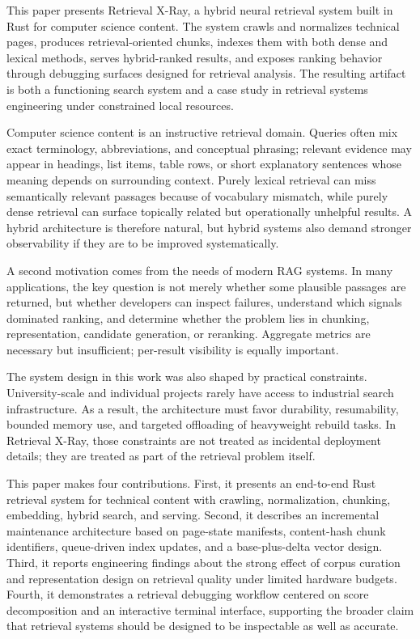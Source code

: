 \documentclass[conference]{IEEEtran}
\newcommand{\system}{Retrieval X-Ray\xspace}
\begin{document}
This paper presents \system, a hybrid neural retrieval system built in Rust for computer science content. The system crawls and normalizes technical pages, produces retrieval-oriented chunks, indexes them with both dense and lexical methods, serves hybrid-ranked results, and exposes ranking behavior through debugging surfaces designed for retrieval analysis. The resulting artifact is both a functioning search system and a case study in retrieval systems engineering under constrained local resources.

Computer science content is an instructive retrieval domain. Queries often mix exact terminology, abbreviations, and conceptual phrasing; relevant evidence may appear in headings, list items, table rows, or short explanatory sentences whose meaning depends on surrounding context. Purely lexical retrieval can miss semantically relevant passages because of vocabulary mismatch, while purely dense retrieval can surface topically related but operationally unhelpful results. A hybrid architecture is therefore natural, but hybrid systems also demand stronger observability if they are to be improved systematically.

A second motivation comes from the needs of modern RAG systems. In many applications, the key question is not merely whether some plausible passages are returned, but whether developers can inspect failures, understand which signals dominated ranking, and determine whether the problem lies in chunking, representation, candidate generation, or reranking. Aggregate metrics are necessary but insufficient; per-result visibility is equally important.

The system design in this work was also shaped by practical constraints. University-scale and individual projects rarely have access to industrial search infrastructure. As a result, the architecture must favor durability, resumability, bounded memory use, and targeted offloading of heavyweight rebuild tasks. In \system, those constraints are not treated as incidental deployment details; they are treated as part of the retrieval problem itself.

This paper makes four contributions. First, it presents an end-to-end Rust retrieval system for technical content with crawling, normalization, chunking, embedding, hybrid search, and serving. Second, it describes an incremental maintenance architecture based on page-state manifests, content-hash chunk identifiers, queue-driven index updates, and a base-plus-delta vector design. Third, it reports engineering findings about the strong effect of corpus curation and representation design on retrieval quality under limited hardware budgets. Fourth, it demonstrates a retrieval debugging workflow centered on score decomposition and an interactive terminal interface, supporting the broader claim that retrieval systems should be designed to be inspectable as well as accurate.
\end{document}
